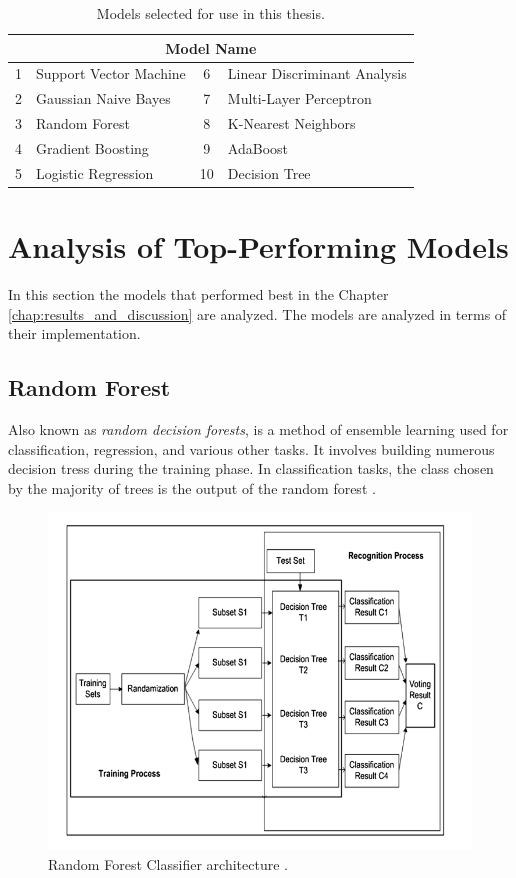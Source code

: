         \begin{table}[ht]
            \centering
            \begin{tabular}{@{}clcl@{}}
                \toprule
                \multicolumn{4}{c}{\textbf{Model Name}} \\
                \midrule
                1 & Support Vector Machine & 6 & Linear Discriminant Analysis \\
                2 & Gaussian Naive Bayes & 7 & Multi-Layer Perceptron \\
                3 & Random Forest & 8 & K-Nearest Neighbors \\
                4 & Gradient Boosting & 9 & AdaBoost \\
                5 & Logistic Regression & 10 & Decision Tree \\
                \bottomrule
            \end{tabular}
            \caption{Models selected for use in this thesis.}
            \label{tab:movements_table}
        \end{table}
    \newpage
    
    \section{Analysis of Top-Performing Models}
        In this section the models that performed best in the Chapter \ref{chap:results_and_discussion} are analyzed. The models are analyzed in terms of their implementation.

        \subsection{Random Forest}
           Also known as \textit{random decision forests}, is a method of ensemble learning used for classification, regression, and various other tasks. It involves building numerous decision tress during the training phase. In classification tasks, the class chosen by the majority of trees is the output of the random forest \cite{ho_random_1998}.

           \begin{figure}[H]
            \centering
            \includegraphics[width=.7\textwidth]{../src/resources/rf_image.png}
            \caption{
                Random Forest Classifier architecture \cite{parmar_review_2019}.
            }
            \label{fig:random_forest}
            \end{figure}

